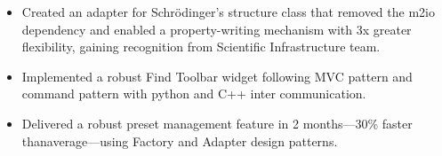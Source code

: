 {        
        \begin{itemize}
            \item Created an adapter for Schrödinger’s structure class that removed the m2io dependency and enabled a property-writing mechanism with 3x greater flexibility, gaining recognition from Scientific Infrastructure team.
            \item Implemented a robust Find Toolbar widget following MVC pattern and command pattern with python and C++ inter communication.
        \end{itemize}

        \begin{itemize}
            \item Delivered a robust preset management feature in 2 months—30\% faster thanaverage—using Factory and Adapter design patterns.
        \end{itemize}
}